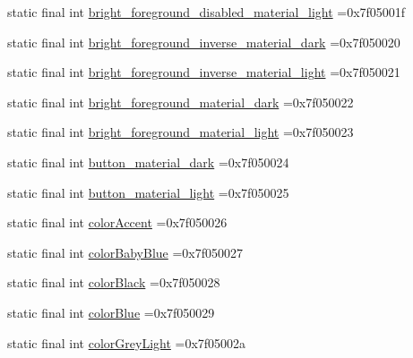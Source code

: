\begin{DoxyCompactItemize}
\item 
static final int \mbox{\hyperlink{classcom_1_1example_1_1trainawearapplication_1_1_r_1_1color_a5d980d9e253b8138f99b613e43894cdf}{bright\+\_\+foreground\+\_\+disabled\+\_\+material\+\_\+light}} =0x7f05001f
\item 
static final int \mbox{\hyperlink{classcom_1_1example_1_1trainawearapplication_1_1_r_1_1color_ac10ce99cdff0a23acbf180cc2c08929f}{bright\+\_\+foreground\+\_\+inverse\+\_\+material\+\_\+dark}} =0x7f050020
\item 
static final int \mbox{\hyperlink{classcom_1_1example_1_1trainawearapplication_1_1_r_1_1color_a28c898fa38d99f2973e13719202f6584}{bright\+\_\+foreground\+\_\+inverse\+\_\+material\+\_\+light}} =0x7f050021
\item 
static final int \mbox{\hyperlink{classcom_1_1example_1_1trainawearapplication_1_1_r_1_1color_a12339f5aecced2046277cf33492e5a40}{bright\+\_\+foreground\+\_\+material\+\_\+dark}} =0x7f050022
\item 
static final int \mbox{\hyperlink{classcom_1_1example_1_1trainawearapplication_1_1_r_1_1color_abf180b965ac93e2fe11e02ecffcf2fd9}{bright\+\_\+foreground\+\_\+material\+\_\+light}} =0x7f050023
\item 
static final int \mbox{\hyperlink{classcom_1_1example_1_1trainawearapplication_1_1_r_1_1color_a2ccd1933d4b88feafbd8aa67cc5f8619}{button\+\_\+material\+\_\+dark}} =0x7f050024
\item 
static final int \mbox{\hyperlink{classcom_1_1example_1_1trainawearapplication_1_1_r_1_1color_acb8f4f180f627e0ca0c536aa1a30090f}{button\+\_\+material\+\_\+light}} =0x7f050025
\item 
static final int \mbox{\hyperlink{classcom_1_1example_1_1trainawearapplication_1_1_r_1_1color_af196192a47a47a14b48ebf6d45d43142}{color\+Accent}} =0x7f050026
\item 
static final int \mbox{\hyperlink{classcom_1_1example_1_1trainawearapplication_1_1_r_1_1color_a45a95360bde46505d64cf6bac9dab59f}{color\+Baby\+Blue}} =0x7f050027
\item 
static final int \mbox{\hyperlink{classcom_1_1example_1_1trainawearapplication_1_1_r_1_1color_adb5a0bce277381ff7b929af4a2982675}{color\+Black}} =0x7f050028
\item 
static final int \mbox{\hyperlink{classcom_1_1example_1_1trainawearapplication_1_1_r_1_1color_a98d2e657cd7335e6268b73798ef9375a}{color\+Blue}} =0x7f050029
\item 
static final int \mbox{\hyperlink{classcom_1_1example_1_1trainawearapplication_1_1_r_1_1color_ac4a889bccee9a9555738ef7ee8b31e62}{color\+Grey\+Light}} =0x7f05002a

\end{DoxyCompactItemize}
